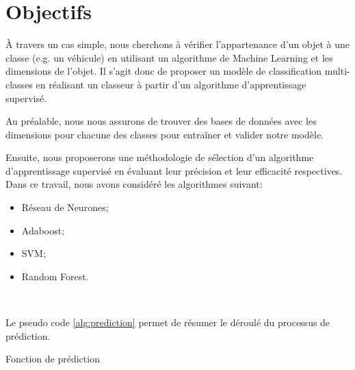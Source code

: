 \documentclass[a4paper]{report}
\begin{document}
\section{Objectifs}

À travers un cas simple, nous cherchons à vérifier l'appartenance d'un objet à une classe (e.g. un véhicule) en utilisant un algorithme de Machine Learning et les dimensions de l'objet. Il s'agit donc de proposer un modèle de classification multi-classes en réalisant un classeur à partir d'un algorithme d'apprentissage supervisé.

Au préalable, nous nous assurons de trouver des bases de données avec les dimensions pour chacune des classes pour entraîner et valider notre modèle. 

Ensuite, nous proposerons une méthodologie de sélection d'un algorithme d'apprentissage supervisé en évaluant leur précision et leur efficacité respectives. Dans ce travail, nous avons considéré les algorithmes suivant: 

\begin{itemize}
\item Réseau de Neurones;
\item Adaboost;
\item SVM;
\item Random Forest.
\end{itemize}

~\par

\noindent Le pseudo code \ref{alg:prediction} permet de résumer le déroulé du processus de prédiction.

\begin{algorithm}[h]
\SetAlgoLined

\medbreak


\medbreak


\medbreak

\caption{Fonction de prédiction\label{alg:prediction}}
\end{algorithm}
\end{document}
